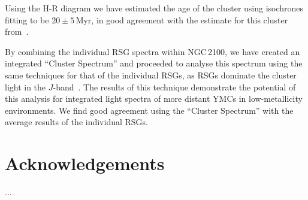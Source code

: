 \documentclass[useAMS,usenatbib]{mn2e}
\begin{document}
Using the H-R diagram we have estimated the age of the cluster using isochrones fitting to be $20\pm5\,$Myr, in good agreement with the estimate for this cluster from~\citet{2015A&A...575A..62N}.

By combining the individual RSG spectra within NGC\,2100, we have created an integrated ``Cluster Spectrum'' and proceeded to analyse this spectrum using the same techniques for that of the individual RSGs, as RSGs dominate the cluster light in the $J$-band~\citep{2013MNRAS.430L..35G}.
The results of this technique demonstrate the potential of this analysis for integrated light spectra of more distant YMCs in low-metallicity environments.
We find good agreement using the ``Cluster Spectrum'' with the average results of the individual RSGs.



\section*{Acknowledgements}

...

% 
\end{document}
